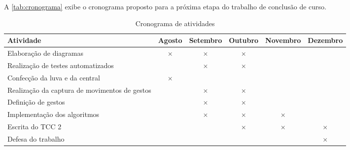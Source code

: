 \label{chapter:cronograma}

A \autoref{tab:cronograma} exibe o cronograma proposto para a próxima etapa do trabalho de conclusão de curso.

\begin{table}[htbp]
  \centering
  \caption{Cronograma de atividades}
  \label{tab:cronograma}
  \begin{tabularx}{\textwidth}{|X|c|c|c|c|c|}
    \hline
    \textbf{Atividade} & \textbf{Agosto} & \textbf{Setembro} & \textbf{Outubro} & \textbf{Novembro} & \textbf{Dezembro} \\
    \hline
    Elaboração de diagramas & \(\times\) & \(\times\) & \(\times\) & & \\
    \hline
    Realização de testes automatizados &  & \(\times\) &  \(\times\) & & \\
    \hline
    Confecção da luva e da central & \(\times\) & & & & \\
    \hline
    Realização da captura de movimentos de gestos & & \(\times\) & \(\times\) & &  \\
    \hline
    Definição de gestos & & \(\times\) & \(\times\)  & &  \\
    \hline
    Implementação dos algoritmos & & \(\times\) & \(\times\)  & \(\times\) & \\
    \hline
    Escrita do TCC 2 & & & \(\times\)  & \(\times\) & \(\times\)\\
    \hline
    Defesa do trabalho & & & &  & \(\times\) \\
    \hline
  \end{tabularx}
\end{table}